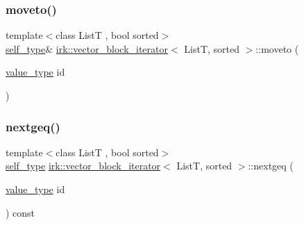 \subsubsection{\texorpdfstring{moveto()}{moveto()}}
{\footnotesize\ttfamily template$<$class ListT , bool sorted$>$ \\
\mbox{\hyperlink{classirk_1_1vector__block__iterator_a39e5fae2a4258ea1a7cad14a66be2908}{self\+\_\+type}}\& \mbox{\hyperlink{classirk_1_1vector__block__iterator}{irk\+::vector\+\_\+block\+\_\+iterator}}$<$ ListT, sorted $>$\+::moveto (\begin{DoxyParamCaption}\item[{\mbox{\hyperlink{classirk_1_1vector__block__iterator_aaf15da7489a2eb86a95b4c309053e6de}{value\+\_\+type}}}]{id }\end{DoxyParamCaption})\hspace{0.3cm}{\ttfamily [inline]}}

\mbox{\label{classirk_1_1vector__block__iterator_acc0471a7ee5d33c78fbbf15ab58e06dc}} 
\subsubsection{\texorpdfstring{nextgeq()}{nextgeq()}}
{\footnotesize\ttfamily template$<$class ListT , bool sorted$>$ \\
\mbox{\hyperlink{classirk_1_1vector__block__iterator_a39e5fae2a4258ea1a7cad14a66be2908}{self\+\_\+type}} \mbox{\hyperlink{classirk_1_1vector__block__iterator}{irk\+::vector\+\_\+block\+\_\+iterator}}$<$ ListT, sorted $>$\+::nextgeq (\begin{DoxyParamCaption}\item[{\mbox{\hyperlink{classirk_1_1vector__block__iterator_aaf15da7489a2eb86a95b4c309053e6de}{value\+\_\+type}}}]{id }\end{DoxyParamCaption}) const\hspace{0.3cm}{\ttfamily [inline]}}

\mbox{\label{classirk_1_1vector__block__iterator_a886fe6a7ba56c67ca63e0a62e756e1fb}} 

